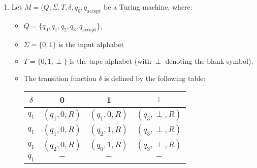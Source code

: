 \documentclass{article}
\begin{document}
\begin{enumerate} 

    \item Let $M=(Q,\Sigma,T,\delta,q_0,q_{\text{accept}}$ be a Turing machine, where:
        \begin{itemize}
            \item[] $Q=\{q_0,q_1,q_2,q_3,q_{\text{accept}}\} $,
            \item[] $\Sigma=\{0,1\} $ is the input alphabet
            \item[] $T=\{0,1,\perp \} $ is the tape alphabet (with $\perp $ denoting the blank symbol).
            \item[] The transition function $\delta$ is defined by the following table:
                \begin{table}[htpb]
                    \centering
                    \begin{tabular}{c|c|c|c}
                    $\delta$ & 0 & 1 & $\perp $ \\
                    \hline
                    $q_1$ &$(q_1,0,R)$ &$(q_1,0,R)$ &$(q_3,\perp ,R)$ \\
                    $q_1$ &$(q_1,0,R)$ &$(q_2,1,R)$ &$(q_3,\perp ,R)$ \\
                    $q_1$ &$(q_2,0,R)$ &$(q_0,1,R)$ &$(q_3,\perp ,R)$ \\
                    $q_1$ &$-$ &$-$ &$-$ \\
                    \end{tabular}
                \end{table}
                
        \end{itemize}


\end{enumerate}
\end{document}
